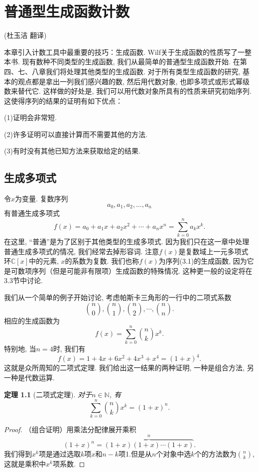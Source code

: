 \documentclass[a4paper,12pt]{ctexbook}
\newtheorem{theorem}[lemma]{\hspace{2em}定理}%
\begin{document}
\setcounter{chapter}{2}


\chapter{普通型生成函数计数}
	\begin{center}
		(杜玉洁 \quad 翻译)
	\end{center}



本章引入计数工具中最重要的技巧：生成函数. Wilf关于生成函数的性质写了一整本书. 现有数种不同类型的生成函数, 我们从最简单的普通型生成函数开始. 在第四、七、八章我们将处理其他类型的生成函数. 对于所有类型生成函数的研究, 基本的观点都是拿出一列我们感兴趣的数, 然后用代数对象, 也即多项式或形式幂级数来替代它. 这样做的好处是, 我们可以用代数对象所具有的性质来研究初始序列. 这使得序列的结果的证明有如下优点：

(1)证明会非常短.

(2)许多证明可以直接计算而不需要其他的方法.

(3)有时没有其他已知方法来获取给定的结果.

\section{生成多项式}
令$x$为变量. 复数序列\[
a_{0},a_{1},a_{2},\dots,a_{n} \tag{3.1}
\]有普通生成多项式
\[
f(x)=a_{0}+a_{1}x+a_{2}x^{2}+\cdots +a_{n}x^{n}=\sum_{k=0}^{n}a_{k}x^{k}.
\]在这里, “普通”是为了区别于其他类型的生成多项式. 因为我们只在这一章中处理普通生成多项式的情况, 我们经常去掉形容词. 注意$f(x)$是复数域上一元多项式环$\mathbb{C}[x]$中的元素, $x$的系数为复数. 我们也称$f(x)$为序列(3.1)的生成函数, 因为它是可数项序列（但是可能非有限项）生成函数的特殊情况. 这种更一般的设定将在3.3节中讨论.

我们从一个简单的例子开始讨论, 考虑帕斯卡三角形的一行中的二项式系数\[
\binom{n}{0},\binom{n}{1},\binom{n}{2},\cdots,\binom{n}{n}.
\]相应的生成函数为
\[f(x)=\sum_{k=0}^{n}\binom{n}{k}x^{k}.\]
特别地, 当$n=4$时, 我们有
\[f(x)=1+4x+6x^{2}+4x^{3}+x^{4}=(1+x)^{4}.\]
这就是众所周知的二项式定理. 我们给出这一结果的两种证明, 一种是组合方法, 另一种是代数运算.
\begin{theorem}[二项式定理]
	对于$n\in \mathbb{N}$, 有
	\[\sum_{k=0}^{n}\binom{n}{k}x^{k}=(1+x)^{n}.\]
\end{theorem}
\begin{proof}
	（组合证明）用乘法分配律展开乘积
	\[(1+x)^{n}=\overbrace{(1+x)(1+x) \cdots(1+x)}^{n}. \] 我们得到$x^{k}$项是通过选取$k$项$x$和$n-k$项1.但是从$n$个对象中选$k$个的方法数为$\binom{n}{k}$,这就是乘积中$x^{k}$项系数.
\end{proof}
\end{document}
